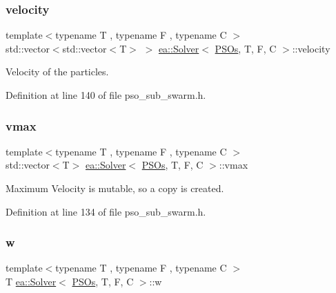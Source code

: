 \subsubsection{\texorpdfstring{velocity}{velocity}}
{\footnotesize\ttfamily template$<$typename T , typename F , typename C $>$ \\
std\+::vector$<$std\+::vector$<$T$>$ $>$ \hyperlink{classea_1_1_solver}{ea\+::\+Solver}$<$ \hyperlink{structea_1_1_p_s_os}{P\+S\+Os}, T, F, C $>$\+::velocity\hspace{0.3cm}{\ttfamily [private]}}



Velocity of the particles. 



Definition at line 140 of file pso\+\_\+sub\+\_\+swarm.\+h.

\mbox{\label{classea_1_1_solver_3_01_p_s_os_00_01_t_00_01_f_00_01_c_01_4_ade5fde673b93afeb9e3cb410d6f1061a}} 
\subsubsection{\texorpdfstring{vmax}{vmax}}
{\footnotesize\ttfamily template$<$typename T , typename F , typename C $>$ \\
std\+::vector$<$T$>$ \hyperlink{classea_1_1_solver}{ea\+::\+Solver}$<$ \hyperlink{structea_1_1_p_s_os}{P\+S\+Os}, T, F, C $>$\+::vmax\hspace{0.3cm}{\ttfamily [private]}}



Maximum Velocity is mutable, so a copy is created. 



Definition at line 134 of file pso\+\_\+sub\+\_\+swarm.\+h.

\mbox{\label{classea_1_1_solver_3_01_p_s_os_00_01_t_00_01_f_00_01_c_01_4_a4f690e68bf36069ba446ef96b03da6f6}} 
\subsubsection{\texorpdfstring{w}{w}}
{\footnotesize\ttfamily template$<$typename T , typename F , typename C $>$ \\
T \hyperlink{classea_1_1_solver}{ea\+::\+Solver}$<$ \hyperlink{structea_1_1_p_s_os}{P\+S\+Os}, T, F, C $>$\+::w\hspace{0.3cm}{\ttfamily [private]}}



